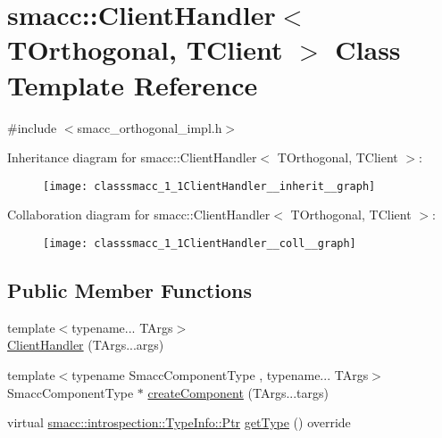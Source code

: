 \hypertarget{classsmacc_1_1ClientHandler}{}\section{smacc\+:\+:Client\+Handler$<$ T\+Orthogonal, T\+Client $>$ Class Template Reference}
\label{classsmacc_1_1ClientHandler}


{\ttfamily \#include $<$smacc\+\_\+orthogonal\+\_\+impl.\+h$>$}



Inheritance diagram for smacc\+:\+:Client\+Handler$<$ T\+Orthogonal, T\+Client $>$\+:
\nopagebreak
\begin{figure}[H]
\begin{center}
\leavevmode
\texttt{[image: classsmacc\_1\_1ClientHandler\_\_inherit\_\_graph]}
\end{center}
\end{figure}


Collaboration diagram for smacc\+:\+:Client\+Handler$<$ T\+Orthogonal, T\+Client $>$\+:
\nopagebreak
\begin{figure}[H]
\begin{center}
\leavevmode
\texttt{[image: classsmacc\_1\_1ClientHandler\_\_coll\_\_graph]}
\end{center}
\end{figure}
\subsection*{Public Member Functions}
\begin{DoxyCompactItemize}
\item 
{\footnotesize template$<$typename... T\+Args$>$ }\\\hyperlink{classsmacc_1_1ClientHandler_a92cb128619bca0f69a948ccf3e0df683}{Client\+Handler} (T\+Args...\+args)
\item 
{\footnotesize template$<$typename Smacc\+Component\+Type , typename... T\+Args$>$ }\\Smacc\+Component\+Type $\ast$ \hyperlink{classsmacc_1_1ClientHandler_a04efa6791578d359b2325f0d268d4cd2}{create\+Component} (T\+Args...\+targs)
\item 
virtual \hyperlink{classsmacc_1_1introspection_1_1TypeInfo_aa6ffd9c39811d59f7c771941b7fad860}{smacc\+::introspection\+::\+Type\+Info\+::\+Ptr} \hyperlink{classsmacc_1_1ClientHandler_a018a50262de782c479414cf18daddac9}{get\+Type} () override
\end{DoxyCompactItemize}



